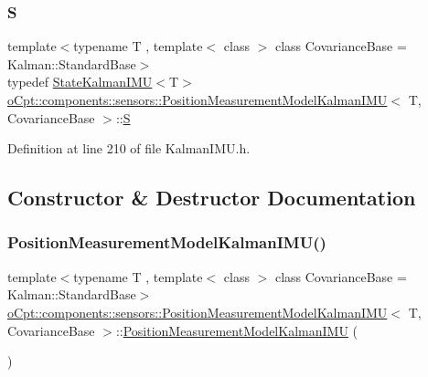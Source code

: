 \subsubsection{\texorpdfstring{S}{S}}
{\footnotesize\ttfamily template$<$typename T , template$<$ class $>$ class Covariance\+Base = Kalman\+::\+Standard\+Base$>$ \\
typedef \hyperlink{classo_cpt_1_1components_1_1sensors_1_1_state_kalman_i_m_u}{State\+Kalman\+I\+MU}$<$T$>$ \hyperlink{classo_cpt_1_1components_1_1sensors_1_1_position_measurement_model_kalman_i_m_u}{o\+Cpt\+::components\+::sensors\+::\+Position\+Measurement\+Model\+Kalman\+I\+MU}$<$ T, Covariance\+Base $>$\+::\hyperlink{classo_cpt_1_1components_1_1sensors_1_1_position_measurement_model_kalman_i_m_u_a79b139fdb8d4569de9b5082297c3397f}{S}}



Definition at line 210 of file Kalman\+I\+M\+U.\+h.



\subsection{Constructor \& Destructor Documentation}
\hypertarget{classo_cpt_1_1components_1_1sensors_1_1_position_measurement_model_kalman_i_m_u_a7b90dedbbcd5de7a65f4318dae1db29f}{}\label{classo_cpt_1_1components_1_1sensors_1_1_position_measurement_model_kalman_i_m_u_a7b90dedbbcd5de7a65f4318dae1db29f} 
\subsubsection{\texorpdfstring{Position\+Measurement\+Model\+Kalman\+I\+M\+U()}{PositionMeasurementModelKalmanIMU()}}
{\footnotesize\ttfamily template$<$typename T , template$<$ class $>$ class Covariance\+Base = Kalman\+::\+Standard\+Base$>$ \\
\hyperlink{classo_cpt_1_1components_1_1sensors_1_1_position_measurement_model_kalman_i_m_u}{o\+Cpt\+::components\+::sensors\+::\+Position\+Measurement\+Model\+Kalman\+I\+MU}$<$ T, Covariance\+Base $>$\+::\hyperlink{classo_cpt_1_1components_1_1sensors_1_1_position_measurement_model_kalman_i_m_u}{Position\+Measurement\+Model\+Kalman\+I\+MU} (\begin{DoxyParamCaption}{ }\end{DoxyParamCaption})\hspace{0.3cm}{\ttfamily [inline]}}



